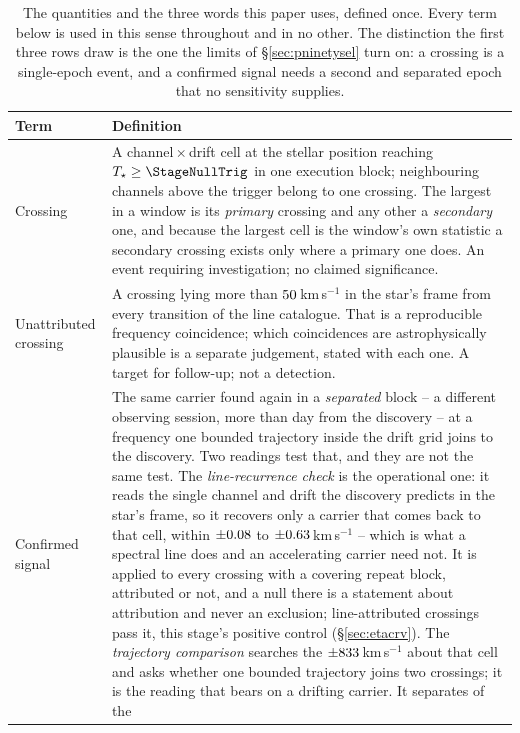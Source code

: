\begin{table}
\centering
\caption{The quantities and the three words this paper uses, defined once.
Every term below is used in this sense throughout and in no other. The
distinction the first three rows draw is the one the limits of
\S\ref{sec:pninetysel} turn on: a crossing is a single-epoch event, and a
confirmed signal needs a second and separated epoch that no sensitivity
supplies.}
\label{tab:quantities}
\small
\begin{tabular}{@{}p{}p{}@{}}
\hline
Term & Definition \\
\hline
Crossing &
A channel\,$\times$\,drift cell at the stellar position reaching
$T_\star\geq\StageNullTrig$ in one execution block; neighbouring channels
above the trigger belong to one crossing. The largest in a window is its
\emph{primary} crossing and any other a \emph{secondary} one, and because the
largest cell is the window's own statistic a secondary crossing exists only
where a primary one does. An event requiring investigation; no claimed
significance. \\
Unattributed crossing &
A crossing lying more than $50$\,km\,s$^{-1}$ in the star's frame
from every transition of the line catalogue. That is a reproducible frequency
coincidence; which coincidences are astrophysically plausible is a separate
judgement, stated with each one. A target for follow-up; not a detection. \\
Confirmed signal &
The same carrier found again in a \emph{separated} block -- a different
observing session, more than \EpSep{} day from the discovery -- at a
frequency one bounded trajectory inside the drift grid joins to the
discovery. Two readings test that, and they are not the same test. The
\emph{line-recurrence check} is the operational one: it reads the single
channel and drift the discovery predicts in the star's frame, so it recovers
only a carrier that comes back to that cell, within $\pm0.08$ to
$\pm0.63$\,km\,s$^{-1}$ -- which is what a spectral line does and an
accelerating carrier need not. It is applied to every crossing with a covering
repeat block, attributed or not, and a null there is a statement about
attribution and never an exclusion; \MkAttrRecur{} line-attributed crossings pass it,
this stage's positive control (\S\ref{sec:etacrv}). The \emph{trajectory
comparison} searches the $\pm833$\,km\,s$^{-1}$ about that cell and
asks whether one bounded trajectory joins two crossings; it is the reading
that bears on a drifting carrier. It separates \TjNExcl{} of the \TjNPair{}

\end{tabular}
\end{table}
